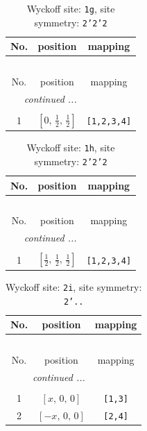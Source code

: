 \documentclass[fleqn,8pt]{jsarticle}
\begin{document}
\renewcommand{\arraystretch}{1.2}
\begin{longtable}{ccc}
\caption{Wyckoff site: {\tt 1g}, site symmetry: {\tt 2'2'2}}
 \\
 \hline \hline
No. & position & mapping \\ \hline \endfirsthead

\multicolumn{2}{l}{\tablename\ \thetable{}} \\
 \hline \hline
No. & position & mapping \\ \hline \endhead

 \hline \hline
\multicolumn{2}{r}{\footnotesize\it continued ...} \\ \endfoot

 \hline \hline
\multicolumn{2}{r}{} \\ \endlastfoot

1 & $\left[ 0,\, \frac{1}{2},\, \frac{1}{2} \right]$ & {\tt [1,2,3,4]} \\
\end{longtable}
\renewcommand{\arraystretch}{1.2}
\begin{longtable}{ccc}
\caption{Wyckoff site: {\tt 1h}, site symmetry: {\tt 2'2'2}}
 \\
 \hline \hline
No. & position & mapping \\ \hline \endfirsthead

\multicolumn{2}{l}{\tablename\ \thetable{}} \\
 \hline \hline
No. & position & mapping \\ \hline \endhead

 \hline \hline
\multicolumn{2}{r}{\footnotesize\it continued ...} \\ \endfoot

 \hline \hline
\multicolumn{2}{r}{} \\ \endlastfoot

1 & $\left[ \frac{1}{2},\, \frac{1}{2},\, \frac{1}{2} \right]$ & {\tt [1,2,3,4]} \\
\end{longtable}
\renewcommand{\arraystretch}{1.2}
\begin{longtable}{ccc}
\caption{Wyckoff site: {\tt 2i}, site symmetry: {\tt 2'..}}
 \\
 \hline \hline
No. & position & mapping \\ \hline \endfirsthead

\multicolumn{2}{l}{\tablename\ \thetable{}} \\
 \hline \hline
No. & position & mapping \\ \hline \endhead

 \hline \hline
\multicolumn{2}{r}{\footnotesize\it continued ...} \\ \endfoot

 \hline \hline
\multicolumn{2}{r}{} \\ \endlastfoot

1 & $\left[ x,\, 0,\, 0 \right]$ & {\tt [1,3]} \\ \hline
2 & $\left[ - x,\, 0,\, 0 \right]$ & {\tt [2,4]} \\
\end{longtable}
\end{document}
